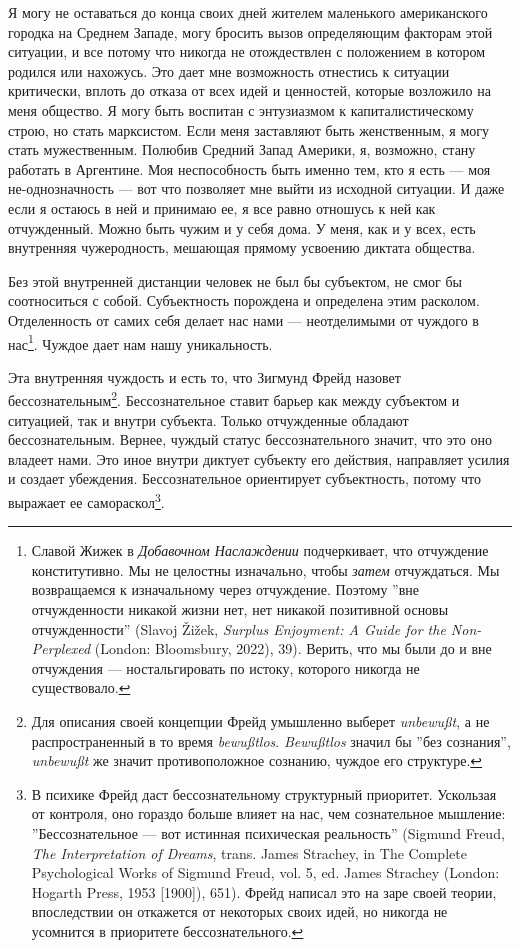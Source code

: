 \documentclass[12pt]{book}
\begin{document}
Я могу не оставаться до конца своих дней жителем маленького американского городка на Среднем Западе, могу бросить вызов определяющим факторам этой ситуации, и все потому что никогда не отождествлен с положением в котором родился или нахожусь. Это дает мне возможность отнестись к ситуации критически, вплоть до отказа от всех идей и ценностей, которые возложило на меня общество. Я могу быть воспитан с энтузиазмом к капиталистическому строю, но стать марксистом. Если меня заставляют быть женственным, я могу стать мужественным. Полюбив Средний Запад Америки, я, возможно, стану работать в Аргентине. Моя неспособность быть именно тем, кто я есть --- моя не-однозначность --- вот что позволяет мне выйти из исходной ситуации. И даже если я остаюсь в ней и принимаю ее, я все равно отношусь к ней как отчужденный. Можно быть чужим и у себя дома. У меня, как и у всех, есть внутренняя чужеродность, мешающая прямому усвоению диктата общества.

Без этой внутренней дистанции человек не был бы субъектом, не смог бы соотноситься с собой. Субъектность порождена и определена этим расколом. Отделенность от самих себя делает нас нами --- неотделимыми от чуждого в нас\footnote{Славой Жижек в \textit{Добавочном Наслаждении} подчеркивает, что отчуждение конститутивно. Мы не целостны изначально, чтобы \textit{затем} отчуждаться. Мы возвращаемся к изначальному через отчуждение. Поэтому ''вне отчужденности никакой жизни нет, нет никакой позитивной основы отчужденности'' (Slavoj Žižek, \textit{Surplus Enjoyment: A Guide for the Non-Perplexed} (London: Bloomsbury, 2022), 39). Верить, что мы были до и вне отчуждения --- ностальгировать по истоку, которого никогда не существовало.}. Чуждое дает нам нашу уникальность.

Эта внутренняя чуждость и есть то, что Зигмунд Фрейд назовет бессознательным\footnote{Для описания своей концепции Фрейд умышленно выберет \textit{unbewußt}, а не распространенный в то время \textit{bewußtlos}. \textit{Bewußtlos} значил бы ''без сознания'', \textit{unbewußt} же значит противоположное сознанию, чуждое его структуре.}. Бессознательное ставит барьер как между субъектом и ситуацией, так и внутри субъекта. Только отчужденные обладают бессознательным. Вернее, чуждый статус бессознательного значит, что это оно владеет нами. Это иное внутри диктует субъекту его действия, направляет усилия и создает убеждения. Бессознательное ориентирует субъектность, потому что выражает ее самораскол\footnote{В психике Фрейд даст бессознательному структурный приоритет. Ускользая от контроля, оно гораздо больше влияет на нас, чем сознательное мышление: ''Бессознательное --- вот истинная психическая реальность'' (Sigmund Freud, \textit{The Interpretation of Dreams}, trans. James Strachey, in The Complete Psychological Works of Sigmund Freud, vol. 5, ed. James Strachey (London: Hogarth Press, 1953 [1900]), 651). Фрейд написал это на заре своей теории, впоследствии он откажется от некоторых своих идей, но никогда не усомнится в приоритете бессознательного.}.
\end{document}
